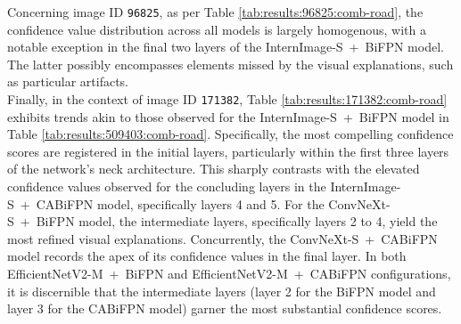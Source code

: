 Concerning image ID \texttt{96825}, as per Table \ref{tab:results:96825:comb-road}, the confidence value distribution across all models is largely homogenous, with a notable exception in the final two layers of the InternImage-S~+~BiFPN model. The latter possibly encompasses elements missed by the visual explanations, such as particular artifacts.\\

Finally, in the context of image ID \texttt{171382}, Table \ref{tab:results:171382:comb-road} exhibits trends akin to those observed for the InternImage-S~+~BiFPN model in Table \ref{tab:results:509403:comb-road}. Specifically, the most compelling confidence scores are registered in the initial layers, particularly within the first three layers of the network's neck architecture. This sharply contrasts with the elevated confidence values observed for the concluding layers in the InternImage-S~+~CABiFPN model, specifically layers 4 and 5. For the ConvNeXt-S~+~BiFPN model, the intermediate layers, specifically layers 2 to 4, yield the most refined visual explanations. Concurrently, the ConvNeXt-S~+~CABiFPN model records the apex of its confidence values in the final layer. In both EfficientNetV2-M~+~BiFPN and EfficientNetV2-M~+~CABiFPN configurations, it is discernible that the intermediate layers (layer 2 for the BiFPN model and layer 3 for the CABiFPN model) garner the most substantial confidence scores.
